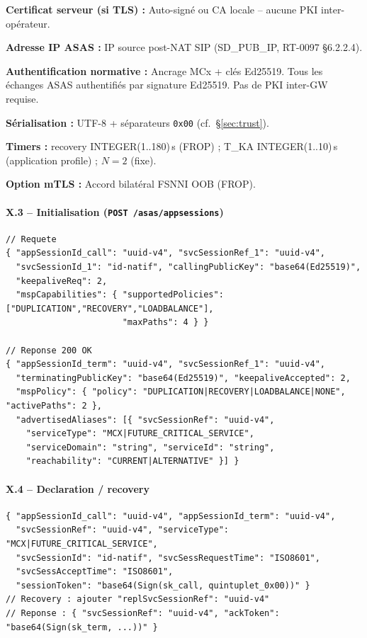 \documentclass[11pt,a4paper]{article}
\begin{document}
\textbf{Certificat serveur (si TLS) :} Auto-signé ou CA locale -- aucune PKI
inter-opérateur.

\textbf{Adresse IP ASAS :} IP source post-NAT SIP (SD\_PUB\_IP, RT-0097 §6.2.2.4).

\textbf{Authentification normative :} Ancrage MCx + clés Ed25519. Tous les échanges
ASAS authentifiés par signature Ed25519. Pas de PKI inter-GW requise.

\textbf{Sérialisation :} UTF-8 + séparateurs \texttt{0x00} (cf.\ §\ref{sec:trust}).

\textbf{Timers :} recovery INTEGER(1..180)\,s (FROP) ; T\_KA INTEGER(1..10)\,s
(application profile) ; $N = 2$ (fixe).

\textbf{Option mTLS :} Accord bilatéral FSNNI OOB (FROP).

\paragraph{X.3 -- Initialisation (\texttt{POST /asas/appsessions})}

\begin{lstlisting}[language={}]
// Requete
{ "appSessionId_call": "uuid-v4", "svcSessionRef_1": "uuid-v4",
  "svcSessionId_1": "id-natif", "callingPublicKey": "base64(Ed25519)",
  "keepaliveReq": 2,
  "mspCapabilities": { "supportedPolicies": ["DUPLICATION","RECOVERY","LOADBALANCE"],
                       "maxPaths": 4 } }

// Reponse 200 OK
{ "appSessionId_term": "uuid-v4", "svcSessionRef_1": "uuid-v4",
  "terminatingPublicKey": "base64(Ed25519)", "keepaliveAccepted": 2,
  "mspPolicy": { "policy": "DUPLICATION|RECOVERY|LOADBALANCE|NONE", "activePaths": 2 },
  "advertisedAliases": [{ "svcSessionRef": "uuid-v4",
    "serviceType": "MCX|FUTURE_CRITICAL_SERVICE",
    "serviceDomain": "string", "serviceId": "string",
    "reachability": "CURRENT|ALTERNATIVE" }] }
\end{lstlisting}

\paragraph{X.4 -- Declaration / recovery}

\begin{lstlisting}[language={}]
{ "appSessionId_call": "uuid-v4", "appSessionId_term": "uuid-v4",
  "svcSessionRef": "uuid-v4", "serviceType": "MCX|FUTURE_CRITICAL_SERVICE",
  "svcSessionId": "id-natif", "svcSessRequestTime": "ISO8601",
  "svcSessAcceptTime": "ISO8601",
  "sessionToken": "base64(Sign(sk_call, quintuplet_0x00))" }
// Recovery : ajouter "replSvcSessionRef": "uuid-v4"
// Reponse : { "svcSessionRef": "uuid-v4", "ackToken": "base64(Sign(sk_term, ...))" }
\end{lstlisting}
\end{document}
